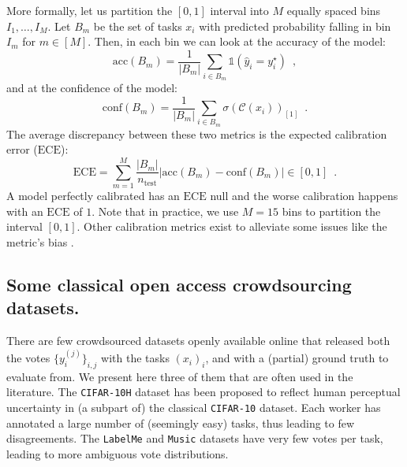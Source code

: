 \begin{itemize}
    More formally, let us partition the $[0,1]$ interval into $M$ equally spaced bins $I_1,\dots,I_M$.
    Let $B_m$ be the set of tasks $x_i$ with predicted probability falling in bin $I_m$ for $m\in [M]$.
    Then, in each bin we can look at the accuracy of the model:
    \begin{equation}\label{eq:accuracyBm}
        \mathrm{acc}(B_m) = \frac{1}{|B_m|}\sum_{i\in B_m} \mathds{1}(\hat y_i = y_i^\star) \enspace,
    \end{equation}
    and at the confidence of the model:
    \begin{equation}\label{eq:confidenceBm}
        \mathrm{conf}(B_m) = \frac{1}{|B_m|}\sum_{i\in B_m} \sigma(\mathcal{C}(x_i))_{[1]} \enspace.
    \end{equation}
    The average discrepancy between these two metrics is the expected calibration error ($\mathrm{ECE}$):
    \begin{equation}\label{eq:ECE}
        \mathrm{ECE} = \sum_{m=1}^M \frac{|B_m|}{n_\text{test}} |\mathrm{acc}(B_m) - \mathrm{conf}(B_m)| \in [0,1] \enspace.
    \end{equation}
    A model perfectly calibrated has an $\mathrm{ECE}$ null and the worse calibration happens with an $\mathrm{ECE}$ of $1$.
    Note that in practice, we use $M=15$ bins to partition the interval $[0,1]$.
    Other calibration metrics exist \citep{kumar2019verified, KIM2020106677} to alleviate some issues like the metric's bias \citep{gruber2022better}.
\end{itemize}

\subsection{Some classical open access crowdsourcing datasets.}
\label{sub:classical-datasets}

There are few crowdsourced datasets openly available online that released both the votes $\{y_i^{(j)}\}_{i,j}$ with the tasks $(x_i)_i$, and with a (partial) ground truth to evaluate from.
We present here three of them that are often used in the literature.
The \texttt{CIFAR-10H} \citep{peterson_human_2019} dataset has been proposed to reflect human perceptual uncertainty in (a subpart of) the classical \texttt{CIFAR-10} dataset.
Each worker has annotated a large number of (seemingly easy) tasks, thus leading to few disagreements.
The \texttt{LabelMe} and \texttt{Music} datasets \citep{rodrigues2014gaussian, rodrigues2017learning} have very few votes per task, leading to more ambiguous vote distributions.

